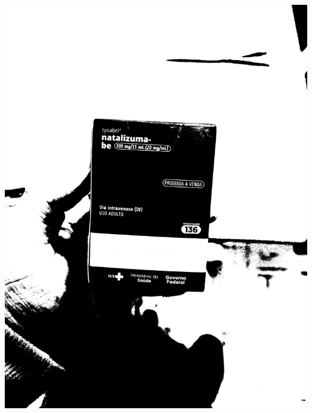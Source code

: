 \begin{frame}
\begin{columns}
\begin{column}{0.24\textwidth}
			\includegraphics[height=0.35\textheight]{../pictures/tysabri_rgb_r_only_thresh.jpg}
			\\\vspace{\floatsep}

\end{column}
\end{columns}
\end{frame}
